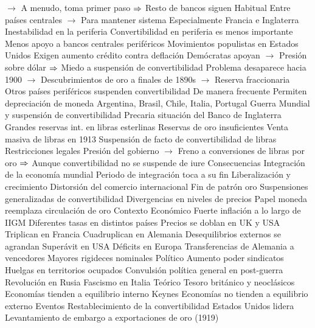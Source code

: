 \documentclass{nuevotema}
\begin{document}
\begin{esquemal}
				\4[] $\to$ A menudo, toma primer paso
				\4[] $\Rightarrow$ Resto de bancos siguen
				\4 Habitual
				\4[] Entre países centrales
				\4[] $\to$ Para mantener sistema
				\4[] Especialmente Francia e Inglaterra
			\3 Inestabilidad en la periferia
				\4 Convertibilidad en periferia es menos importante
				\4[] Menos apoyo a bancos centrales periféricos
				\4 Movimientos populistas en Estados Unidos
				\4[] Exigen aumento crédito contra deflación
				\4[] Demócratas apoyan
				\4[] $\to$ Presión sobre dólar
				\4[] $\Rightarrow$ Miedo a suspensión de convertibilidad
				\4[] Problema desaparece hacia 1900
				\4[] $\to$ Descubrimientos de oro a finales de 1890s
				\4[] $\to$ Reserva fraccionaria
				\4 Otros países periféricos suspenden convertibilidad
				\4[] De manera frecuente
				\4[] Permiten depreciación de moneda
				\4[] Argentina, Brasil, Chile, Italia, Portugal
			\3 Guerra Mundial y suspensión de convertibilidad
				\4 Precaria situación del Banco de Inglaterra
				\4[] Grandes reservas int. en libras esterlinas
				\4[] Reservas de oro insuficientes
				\4 Venta masiva de libras en 1913
				\4 Suspensión de facto de convertibilidad de libras
				\4[] Restricciones legales
				\4[] Presión del gobierno
				\4[] $\to$ Freno a conversiones de libras por oro
				\4[] $\Rightarrow$ Aunque convertibilidad no se suspende de iure
		\2 Consecuencias
			\3 Integración de la economía mundial
				\4 Periodo de integración toca a su fin
			\3 Liberalización y crecimiento
				\4 Distorsión del comercio internacional
			\3 Fin de patrón oro
				\4 Suspensiones generalizadas de convertibilidad
				\4 Divergencias en niveles de precios
				\4 Papel moneda reemplaza circulación de oro
	\1 
		\2 Contexto
			\3 Económico
				\4 Fuerte inflación a lo largo de IIGM
				\4 Diferentes tasas en distintos países
				\4[] Precios se doblan en UK y USA
				\4[] Triplican en Francia
				\4[] Cuadruplican en Alemania
				\4 Desequilibrios externos se agrandan
				\4[] Superávit en USA
				\4[] Déficits en Europa
				\4 Transferencias de Alemania a vencedores
				\4 Mayores rigideces nominales
			\3 Político
				\4 Aumento poder sindicatos
				\4 Huelgas en territorios ocupados
				\4 Convulsión política general en post-guerra
				\4 Revolución en Rusia
				\4 Fascismo en Italia
			\3 Teórico
				\4 Tesoro británico y neoclásicos
				\4[] Economías tienden a equilibrio interno
				\4 Keynes
				\4[] Economías no tienden a equilibrio externo
		\2 Eventos
			\3 Restablecimiento de la convertibilidad
				\4 Estados Unidos lidera
				\4[] Levantamiento de embargo a exportaciones de oro (1919)

\end{esquemal}
\end{document}
